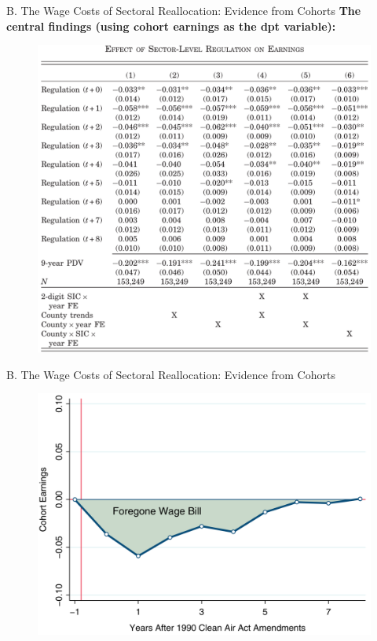 \documentclass{beamer}
\begin{document}
\begin{frame}{B. The Wage Costs of Sectoral Reallocation: Evidence from Cohorts}
	\textbf{The central findings (using cohort earnings as the dpt variable):}
	\begin{figure}[h]
		\centering
		\includegraphics[scale=0.29]{table2.png}
	\end{figure}
\end{frame}
\begin{frame}[label=figure3]{B. The Wage Costs of Sectoral Reallocation: Evidence from Cohorts}
	\begin{figure}[h]
		\centering
		\includegraphics[scale=0.35]{figure3.png}
	\end{figure}
\end{frame}
\end{document}

